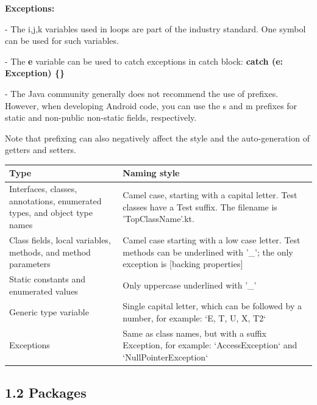 \textbf{Exceptions:}

- The i,j,k variables used in loops are part of the industry standard. One symbol can be used for such variables.

- The \textbf{e} variable can be used to catch exceptions in catch block: \textbf{catch (e: Exception) \{\}}

- The Java community generally does not recommend the use of prefixes. However, when developing Android code, you can use the s and m prefixes for static and non-public non-static fields, respectively.

Note that prefixing can also negatively affect the style and the auto-generation of getters and setters.



\begin{center}

\begin{tabular}{ |p{7.5cm}|p{7.5cm}| }

\hline

Type&Naming style\\

\hline

 Interfaces, classes, annotations, enumerated types, and object type names & Camel case, starting with a capital letter. Test classes have a Test suffix. The filename is 'TopClassName'.kt.  \\

 Class fields, local variables, methods, and method parameters & Camel case starting with a low case letter. Test methods can be underlined with '\_'; the only exception is [backing properties]\\

 Static constants and enumerated values & Only uppercase underlined with '\_' \\

 Generic type variable & Single capital letter, which can be followed by a number, for example: `E, T, U, X, T2` \\

 Exceptions & Same as class names, but with a suffix Exception, for example: `AccessException` and `NullPointerException`\\

\hline

\end{tabular}

\end{center}

\subsection*{\textbf{1.2 Packages}}


